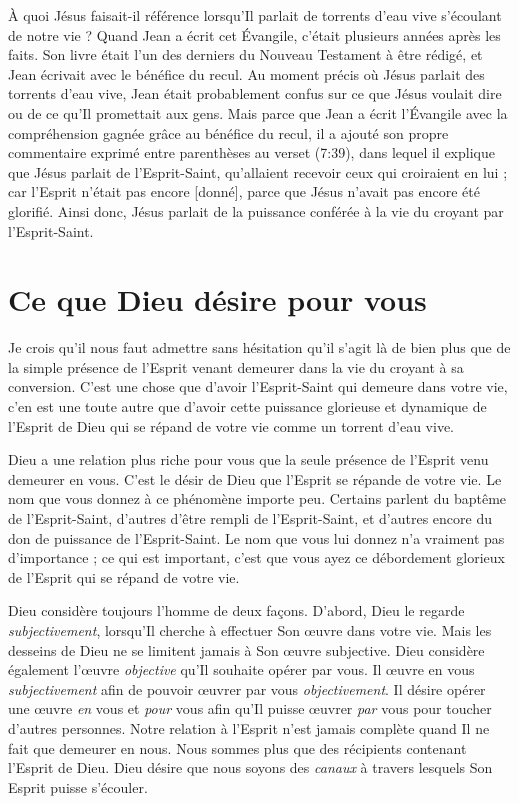 À quoi Jésus faisait-il référence lorsqu'Il parlait de
 \Og torrents d'eau vive \Fg{} s'écoulant de notre vie ?
 Quand Jean a écrit cet Évangile, c'était plusieurs années après les faits.
 Son livre était l'un des derniers du Nouveau Testament à être rédigé,
 et Jean écrivait avec le bénéfice du recul. Au moment précis où Jésus parlait
 des torrents d'eau vive, Jean était probablement confus sur ce que
 Jésus voulait dire ou de ce qu'Il promettait aux gens.
 Mais parce que Jean a écrit l'Évangile avec la compréhension gagnée grâce
 au bénéfice du recul, il a ajouté son propre commentaire exprimé entre
 parenthèses au verset (7:39), dans lequel il explique que Jésus
 parlait de l'Esprit-Saint, \Og qu'allaient recevoir ceux qui croiraient
 en lui ; car l'Esprit n'était pas encore [donné], parce que Jésus n'avait
 pas encore été glorifié. \Fg{}
 Ainsi donc, Jésus parlait de la puissance conférée à la vie du croyant
 par l'Esprit-Saint.


\section{Ce que Dieu d\'esire pour vous}

Je crois qu'il nous faut admettre sans hésitation qu'il s'agit là de bien
 plus que de la simple présence de l'Esprit venant demeurer dans la vie
 du croyant à sa conversion. C'est une chose que d'avoir l'Esprit-Saint
 qui demeure dans votre vie, c'en est une toute autre que d'avoir cette puissance
 glorieuse et dynamique de l'Esprit de Dieu qui se répand de votre vie
 comme un torrent d'eau vive.

Dieu a une relation plus riche pour vous que la seule présence de l'Esprit
 venu demeurer en vous. C'est le désir de Dieu que l'Esprit se répande
 de votre vie. Le nom que vous donnez à ce phénomène importe peu.
 Certains parlent du baptême de l'Esprit-Saint,
 d'autres d'être rempli de l'Esprit-Saint, et d'autres encore du don
 de puissance de l'Esprit-Saint. Le nom que vous lui donnez n'a vraiment
 pas d'im\-por\-tan\-ce ; ce qui est important, c'est que vous ayez ce débordement
 glorieux de l'Esprit qui se répand de votre vie.

Dieu considère toujours l'homme de deux façons. D'abord, Dieu le regarde
 \emph{subjectivement}, lorsqu'Il cherche à effectuer Son œuvre
 dans votre vie.
 Mais les desseins de Dieu ne se limitent jamais à Son œuvre subjective.
 Dieu considère également l'œuvre \emph{objective} qu'Il souhaite opérer
 par vous.
 Il œuvre en vous \emph{subjectivement} afin de pouvoir œuvrer par vous
 \emph{objectivement}. Il désire opérer une œuvre \emph{en} vous
 et \emph{pour} vous afin
 qu'Il puisse œuvrer \emph{par} vous pour toucher d'autres personnes.
 Notre relation à l'Esprit n'est jamais complète quand Il ne fait que
 demeurer en nous. Nous sommes plus que des récipients contenant
 l'Esprit de Dieu. Dieu désire que nous soyons des \emph{canaux} à travers
 lesquels Son Esprit puisse s'écouler.


